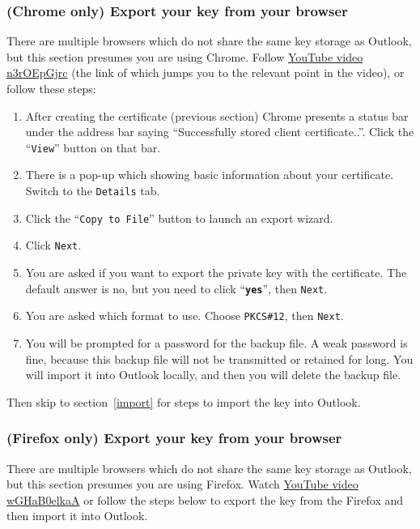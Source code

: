 \documentclass[pdftex,12pt,titlepage=false]{scrartcl}
\begin{document}
\subsubsection{(Chrome only) Export your key from your browser}
There are multiple browsers which do not share the same key storage as
Outlook, but this section presumes you are using Chrome.  Follow
\href{https://www.youtube.com/watch?v=n3rOEpGjrc\&start=310}{YouTube
  video n3rOEpGjrc} (the link of which jumps you to the relevant point
in the video), or follow these steps:

\begin{minipage}{\textwidth}%
\begin{multicols}{2}
  \begin{enumerate}
  \item After creating the certificate (previous section) Chrome
    presents a status bar under the address bar saying ``Successfully
    stored client certificate..''.  Click the ``\texttt{View}'' button
    on that bar.
  \item There is a pop-up which showing basic information about your
    certificate.  Switch to the \texttt{Details} tab.
  \item Click the ``\texttt{Copy to File}'' button to launch an export
    wizard.
  \item Click \texttt{Next}.
  \item You are asked if you want to export the private key with the
    certificate.  The default answer is no, but you need to click
    ``\textbf{\texttt{yes}}'', then \texttt{Next}.
  \item You are asked which format to use.  Choose \texttt{PKCS\#12},
    then \texttt{Next}.
  \item You will be prompted for a password for the backup file.  A
    weak password is fine, because this backup file will not be
    transmitted or retained for long.  You will import it into Outlook
    locally, and then you will delete the backup file.
  \end{enumerate}
\end{multicols}
\end{minipage}

\vspace{1em}
Then skip to section~\ref{import} for steps to import the key into
Outlook.

\subsubsection{(Firefox only) Export your key from your browser}
There are multiple browsers which do not share the same key storage as
Outlook, but this section presumes you are using Firefox.  Watch
\href{https://www.youtube.com/watch?v=wGHaB0elkaA\&start=226}{YouTube
  video wGHaB0elkaA} or follow the steps below to export the key from
the Firefox and then import it into Outlook.
\end{document}
